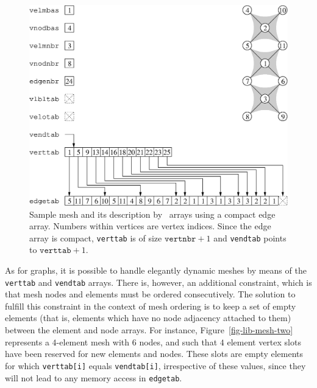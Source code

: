 \begin{figure}
\centering\includegraphics[scale=0.47]{s_f_me1.eps}
\caption{Sample mesh and its description by \libscotch\ arrays using a
compact edge array. Numbers within vertices are vertex indices. Since the
edge array is compact, {\tt verttab} is of size $\mathtt{vertnbr} +
1$ and {\tt vendtab} points to $\mathtt{verttab} + 1$.}
\label{fig-lib-mesh-one}
\end{figure}

As for graphs, it is possible to handle elegantly dynamic meshes by
means of the {\tt verttab} and {\tt vendtab} arrays. There is,
however, an additional constraint, which is that mesh nodes and
elements must be ordered consecutively. The solution to fulfill this
constraint in the context of mesh ordering is to keep a set of empty
elements (that is, elements which have no node adjacency attached to
them) between the element and node arrays. For instance,
Figure~\ref{fig-lib-mesh-two} represents a $4$-element mesh with $6$
nodes, and such that $4$ element vertex slots have been reserved for
new elements and nodes. These slots are empty elements for which
{\tt verttab[i]} equals {\tt vendtab[i]}, irrespective of these
values, since they will not lead to any memory access in {\tt edgetab}.

